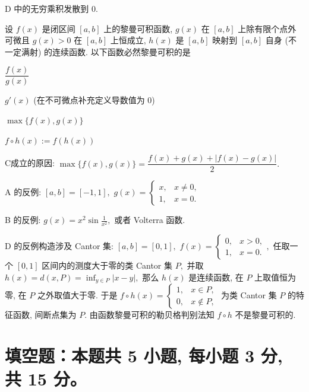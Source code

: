 \begin{solution}
D 中的无穷乘积发散到 $0.$
\end{solution}

\begin{question}
设 $f(x)$ 是闭区间 $[a, b]$ 上的黎曼可积函数, $g(x)$ 在 $[a, b]$ 上除有限个点外可微且 $g(x) > 0$ 在 $[a, b]$ 上恒成立, $h(x)$ 是 $[a, b]$ 映射到 $[a, b]$ 自身 (不一定满射) 的连续函数. 以下函数必然黎曼可积的是 \paren[C]

\begin{choices}
\item $\dfrac{f(x)}{g(x)}$
\item $g'(x)$ (在不可微点补充定义导数值为 $0$)
\item $\max \{ f(x), g(x) \}$
\item $f \circ h(x) := f(h(x))$
\end{choices}
\end{question}

\begin{solution}
C成立的原因: $\max \{ f(x), g(x) \} = \dfrac{f(x) + g(x) + |f(x) - g(x)|}{2}.$

A 的反例: $[a, b] = [-1, 1],$ $g(x) = \begin{cases}
x, & x \neq 0, \\ 1, & x = 0. \end{cases}$

B 的反例: $g(x) = x^2 \sin\frac{1}{x^2},$ 或者 Volterra 函数.

D 的反例构造涉及 Cantor 集: $[a, b] = [0, 1],$ $f(x) = \begin{cases} 0, & x > 0, \\ 1, & x = 0. \end{cases},$ 任取一个 $[0, 1]$ 区间内的测度大于零的类 Cantor 集 $P,$ 并取 $\displaystyle h(x) = d(x, P) = \inf_{y\in P} |x - y|,$ 那么 $h(x)$ 是连续函数, 在 $P$ 上取值恒为零, 在 $P$ 之外取值大于零. 于是 $f\circ h(x) = \begin{cases} 1, & x \in P, \\ 0, & x \not \in P, \end{cases}$ 为类 Cantor 集 $P$ 的特征函数, 间断点集为 $P.$ 由函数黎曼可积的勒贝格判别法知 $f\circ h$ 不是黎曼可积的.
\end{solution}


\section{填空题：本题共 5 小题, 每小题 3 分, 共 15 分。}

